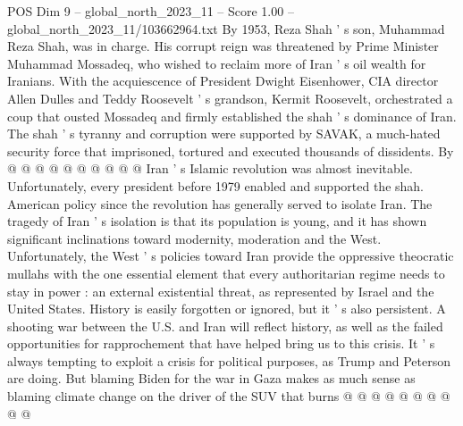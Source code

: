 \begin{textsample}{POS Dim 9 – global\_north\_2023\_11 – Score 1.00 – global\_north\_2023\_11/103662964.txt}
By 1953, Reza Shah ' s son, Muhammad Reza Shah, was in charge.
His corrupt reign was threatened by Prime Minister Muhammad Mossadeq, who wished to reclaim more of Iran ' s oil wealth for Iranians.
With the acquiescence of President Dwight Eisenhower, CIA director Allen Dulles and Teddy Roosevelt ' s grandson, Kermit Roosevelt, orchestrated a coup that ousted Mossadeq and firmly established the shah ' s dominance of Iran.
The shah ' s tyranny and corruption were supported by SAVAK, a much-hated security force that imprisoned, tortured and executed thousands of dissidents.
By @ @ @ @ @ @ @ @ @ @ Iran ' s Islamic revolution was almost inevitable.
Unfortunately, every president before 1979 enabled and supported the shah.
American policy since the revolution has generally served to isolate Iran.
The tragedy of Iran ' s isolation is that its population is young, and it has shown significant inclinations toward modernity, moderation and the West.
Unfortunately, the West ' s policies toward Iran provide the oppressive theocratic mullahs with the one essential element that every authoritarian regime needs to stay in power : an external existential threat, as represented by Israel and the United States.
History is easily forgotten or ignored, but it ' s also persistent.
A shooting war between the U.S. and Iran will reflect history, as well as the failed opportunities for rapprochement that have helped bring us to this crisis.
It ' s always tempting to exploit a crisis for political purposes, as Trump and Peterson are doing.
But blaming Biden for the war in Gaza makes as much sense as blaming climate change on the driver of the SUV that burns @ @ @ @ @ @ @ @ @ @

\end{textsample}
